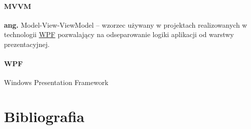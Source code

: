 \documentclass[10pt,a4paper]{article}
\begin{document}
\label{abbr:mvvm}
\paragraph{MVVM} \textbf{ang.} Model-View-ViewModel -- wzorzec używany w projektach realizowanych w technologii \hyperref[abbr:wpf]{WPF} pozwalający na odseparowanie logiki aplikacji od warstwy prezentacyjnej. 

\label{abbr:wpf}
\paragraph{WPF} Windows Presentation Framework

\renewcommand*{\refname}{\vspace*{-2em}}
\section{Bibliografia}
\end{document}
